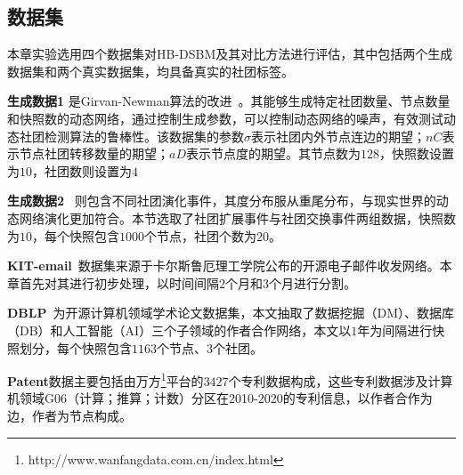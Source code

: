 \subsection{数据集}

本章实验选用四个数据集对HB-DSBM及其对比方法进行评估，其中包括两个生成数据集和两个真实数据集，均具备真实的社团标签。

\textbf{生成数据1} 是Girvan-Newman算法的改进~\cite{lin2008facetnet}。其能够生成特定社团数量、节点数量和快照数的动态网络，通过控制生成参数，可以控制动态网络的噪声，有效测试动态社团检测算法的鲁棒性。该数据集的参数$\sigma$表示社团内外节点连边的期望；$nC$表示节点社团转移数量的期望；$aD$表示节点度的期望。其节点数为$128$，快照数设置为$10$，社团数则设置为$4$

\textbf{生成数据2} ~\cite{greene2010tracking}则包含不同社团演化事件，其度分布服从重尾分布，与现实世界的动态网络演化更加符合。本节选取了社团扩展事件与社团交换事件两组数据，快照数为$10$，每个快照包含$1000$个节点，社团个数为$20$。

\textbf{KIT-email}~\cite{gorkedynamic}数据集来源于卡尔斯鲁厄理工学院公布的开源电子邮件收发网络。本章首先对其进行初步处理，以时间间隔$2个月$和$3个月$进行分割。

\textbf{DBLP}~\cite{konect:2017:dblp-cite}为开源计算机领域学术论文数据集，本文抽取了数据挖掘（DM）、数据库（DB）和人工智能（AI）三个子领域的作者合作网络，本文以$1$年为间隔进行快照划分，每个快照包含$1163$个节点、$3$个社团。

\textbf{Patent}数据主要包括由万方\footnote{ http://www.wanfangdata.com.cn/index.html}平台的$3427$个专利数据构成，这些专利数据涉及计算机领域G06（计算；推算；计数）分区在2010-2020的专利信息，以作者合作为边，作者为节点构成。

